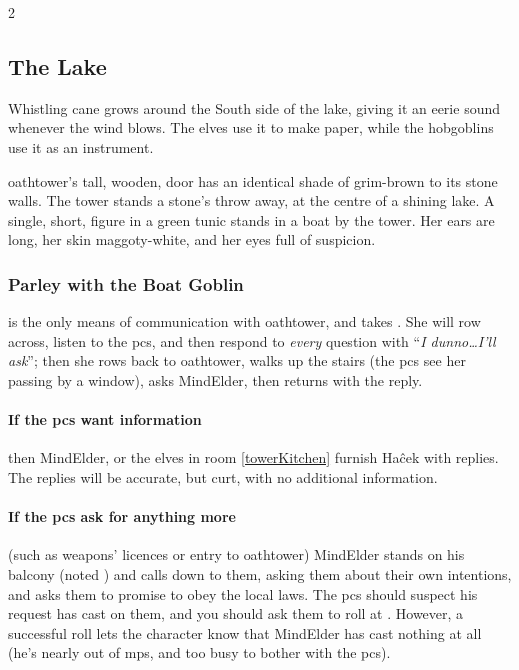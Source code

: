 \begin{multicols}{2}

\subsection{The Lake}

\noindent
Whistling cane grows around the South side of the lake, giving it an eerie sound whenever the wind blows.%
The elves use it to make paper, while the hobgoblins use it as an instrument.

\begin{boxtext}
  \Gls{oathtower}'s tall, wooden, door has an identical shade of grim-brown to its stone walls.
  The tower stands a stone's throw away, at the centre of a shining lake.
  A single, short, figure in a green tunic stands in a boat by the tower.
  Her ears are long, her skin maggoty-white, and her eyes full of suspicion.
\end{boxtext}

\subsubsection{Parley with the Boat Goblin}
is the only means of communication with \gls{oathtower}, and takes .
She will row across, listen to the \glspl{pc}, and then respond to \emph{every} question with ``\textit{I dunno\ldots I'll ask}''; then she rows back to \gls{oathtower}, walks up the stairs (the \glspl{pc} see her passing by a window), asks \gls{MindElder}, then returns with the reply.

\paragraph{If the \glspl{pc} want information}
then \gls{MindElder}, or the elves in room \vref{towerKitchen} furnish Ha\^{c}ek with replies.
The replies will be accurate, but curt, with no additional information.

\paragraph{If the \glspl{pc} ask for anything more}
(such as weapons' licences or entry to \gls{oathtower})
\Gls{MindElder} stands on his balcony (noted ) and calls down to them, asking them about their own intentions, and asks them to promise to obey the local laws.
The \glspl{pc} should suspect his request has cast  on them, and you should ask them to roll  at \tn[13].
However, a successful roll lets the character know that \gls{MindElder} has cast nothing at all (he's nearly out of \glspl{mp}, and too busy to bother with the \glspl{pc}).


\end{multicols}
